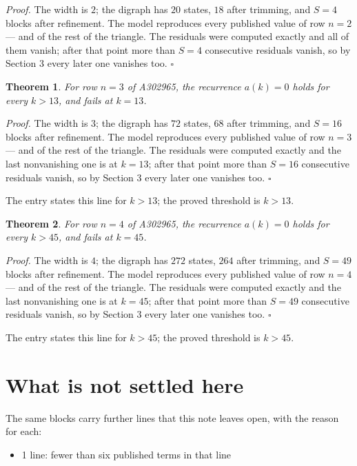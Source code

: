 \documentclass[11pt]{article}
\newtheorem{theorem}{Theorem}
\theoremstyle{definition}
\begin{document}
{\itshape Proof.} The width is $2$; the digraph has $20$ states, $18$ after trimming, and $S = 4$ blocks after refinement. The model reproduces every published value of row $n = 2$ --- and of the rest of the triangle. The residuals were computed exactly and all of them vanish; after that point more than $S = 4$ consecutive residuals vanish, so by Section 3 every later one vanishes too. $\square$

\begin{theorem} For row $n = 3$ of A302965, the recurrence $a(k) = 0$ holds for every $k > 13$, and fails at $k = 13$.\end{theorem}

{\itshape Proof.} The width is $3$; the digraph has $72$ states, $68$ after trimming, and $S = 16$ blocks after refinement. The model reproduces every published value of row $n = 3$ --- and of the rest of the triangle. The residuals were computed exactly and the last nonvanishing one is at $k = 13$; after that point more than $S = 16$ consecutive residuals vanish, so by Section 3 every later one vanishes too. $\square$

The entry states this line for $k > 13$; the proved threshold is $k > 13$.

\begin{theorem} For row $n = 4$ of A302965, the recurrence $a(k) = 0$ holds for every $k > 45$, and fails at $k = 45$.\end{theorem}

{\itshape Proof.} The width is $4$; the digraph has $272$ states, $264$ after trimming, and $S = 49$ blocks after refinement. The model reproduces every published value of row $n = 4$ --- and of the rest of the triangle. The residuals were computed exactly and the last nonvanishing one is at $k = 45$; after that point more than $S = 49$ consecutive residuals vanish, so by Section 3 every later one vanishes too. $\square$

The entry states this line for $k > 45$; the proved threshold is $k > 45$.

\section{What is not settled here}

The same blocks carry further lines that this note leaves open, with the reason for each:

\begin{itemize}

\item 1 line: fewer than six published terms in that line

\end{itemize}
\end{document}
